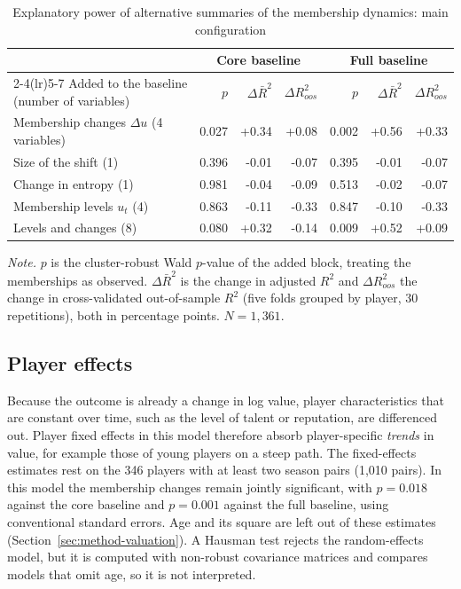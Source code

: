 \begin{table}[ht]
	\centering
	\small
	\caption{Explanatory power of alternative summaries of the membership dynamics: main configuration}
	\label{tab:comparison}
	\begin{tabular}{lrrrrrr}
		\toprule
		 & \multicolumn{3}{c}{Core baseline} & \multicolumn{3}{c}{Full baseline} \\
		\cmidrule(lr){2-4}\cmidrule(lr){5-7}
		Added to the baseline (number of variables) & $p$ & $\Delta\bar R^2$ & $\Delta R^2_{oos}$ & $p$ & $\Delta\bar R^2$ & $\Delta R^2_{oos}$ \\
		\midrule
Membership changes $\Delta u$ (4 variables) & 0.027 & +0.34 & +0.08 & 0.002 & +0.56 & +0.33 \\
Size of the shift (1) & 0.396 & -0.01 & -0.07 & 0.395 & -0.01 & -0.07 \\
Change in entropy (1) & 0.981 & -0.04 & -0.09 & 0.513 & -0.02 & -0.07 \\
Membership levels $u_t$ (4) & 0.863 & -0.11 & -0.33 & 0.847 & -0.10 & -0.33 \\
Levels and changes (8) & 0.080 & +0.32 & -0.14 & 0.009 & +0.52 & +0.09 \\
		\bottomrule
	\end{tabular}
	\par\smallskip
	\parbox{0.95\textwidth}{\footnotesize\emph{Note.} $p$ is the cluster-robust Wald $p$-value of the added block, treating the memberships as observed. $\Delta\bar R^2$ is the change in adjusted $R^2$ and $\Delta R^2_{oos}$ the change in cross-validated out-of-sample $R^2$ (five folds grouped by player, 30 repetitions), both in percentage points. $N=1{,}361$.}
\end{table}

\subsection{Player effects}

Because the outcome is already a change in log value, player characteristics that are constant over time, such as the level of talent or reputation, are differenced out. Player fixed effects in this model therefore absorb player-specific \emph{trends} in value, for example those of young players on a steep path. The fixed-effects estimates rest on the 346 players with at least two season pairs (1,010 pairs). In this model the membership changes remain jointly significant, with $p=0.018$ against the core baseline and $p=0.001$ against the full baseline, using conventional standard errors. Age and its square are left out of these estimates (Section~\ref{sec:method-valuation}). A Hausman test rejects the random-effects model, but it is computed with non-robust covariance matrices and compares models that omit age, so it is not interpreted.

